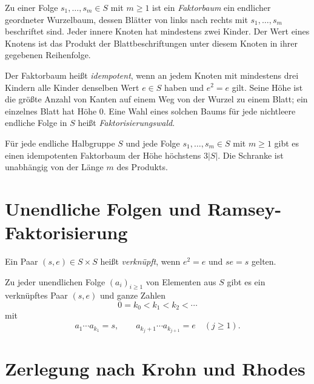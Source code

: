 \begin{definition}
\label{def:b37-guide-factor-tree}
Zu einer Folge $s_1,\ldots,s_m\in S$ mit $m\geq 1$ ist ein
\emph{Faktorbaum} ein endlicher geordneter Wurzelbaum, dessen Blätter
von links nach rechts mit $s_1,\ldots,s_m$ beschriftet sind.
Jeder innere Knoten hat mindestens zwei Kinder. Der Wert eines Knotens
ist das Produkt der Blattbeschriftungen unter diesem Knoten in ihrer
gegebenen Reihenfolge.

Der Faktorbaum heißt \emph{idempotent}, wenn an jedem Knoten mit
mindestens drei Kindern alle Kinder denselben Wert $e\in S$ haben und
$e^2=e$ gilt. Seine Höhe ist die größte Anzahl von Kanten auf einem
Weg von der Wurzel zu einem Blatt; ein einzelnes Blatt hat Höhe $0$.
Eine Wahl eines solchen Baums für jede nichtleere endliche Folge in $S$
heißt \emph{Faktorisierungswald}.
\end{definition}

\begin{theorem}
\label{thm:b37-guide-factor-forest}
Für jede endliche Halbgruppe $S$ und jede Folge
$s_1,\ldots,s_m\in S$ mit $m\geq1$ gibt es einen idempotenten
Faktorbaum der Höhe höchstens $3|S|$.
Die Schranke ist unabhängig von der Länge $m$ des Produkts.
\cite{Simon1990,Kufleitner2008}
\end{theorem}

\section{Unendliche Folgen und Ramsey-Faktorisierung}

\begin{definition}
Ein Paar $(s,e)\in S\times S$ heißt \emph{verknüpft}, wenn
$e^2=e$ und $se=s$ gelten.
\end{definition}

\begin{theorem}
\label{guide:ramsey-factorization}
Zu jeder unendlichen Folge $(a_i)_{i\geq1}$ von Elementen aus $S$
gibt es ein verknüpftes Paar $(s,e)$ und ganze Zahlen
\[
 0=k_0<k_1<k_2<\cdots
\]
mit
\[
 a_1\cdots a_{k_1}=s,\qquad
 a_{k_j+1}\cdots a_{k_{j+1}}=e\quad(j\geq1).
\]
\cite{carton2007}
\end{theorem}

\section{Zerlegung nach Krohn und Rhodes}

